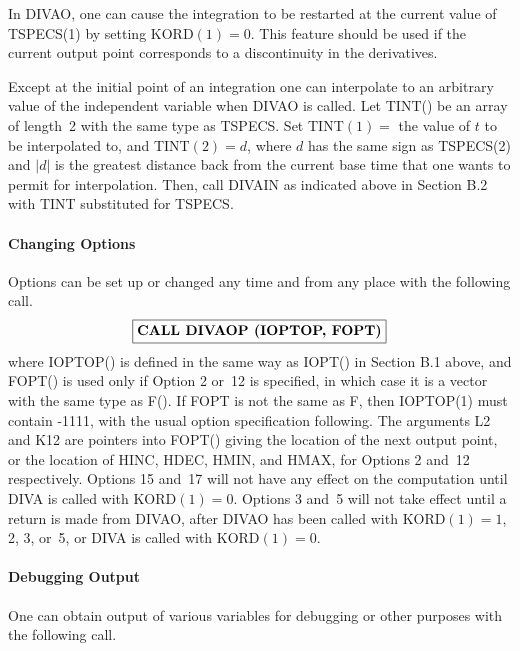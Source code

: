 \documentclass[twoside]{MATH77}
\begin{document}
In DIVAO, one can cause the integration to be restarted at the current
value of TSPECS(1) by setting KORD$(1)=0$. This feature should be used if
the current output point corresponds to a discontinuity in the derivatives.

Except at the initial point of an integration one can interpolate to an
arbitrary value of the independent variable when DIVAO is called. Let
TINT() be an array of length~2 with the same type as TSPECS. Set TINT$(1)=$
the value of $t$ to be interpolated to, and TINT$(2)=d$, where $d$ has the
same sign as TSPECS(2) and $|d|$ is the greatest distance back from the
current base time that one wants to permit for interpolation. Then, call
DIVAIN as indicated above in Section B.2 with TINT substituted for TSPECS.

\paragraph{Changing Options}
Options can be set up or changed any time and from any place with the
following call.
$$
\fbox{\bf CALL DIVAOP (IOPTOP, FOPT)}
$$
where IOPTOP() is defined in the same way as IOPT() in Section B.1
above, and FOPT() is used only if Option 2 or~12 is specified, in
which case it is a vector with the same type as F().  If FOPT is not
the same as F, then IOPTOP(1) must contain -1111, with the usual
option specification following.  The arguments L2 and K12 are pointers
into FOPT() giving the location of the next output point, or the
location of HINC, HDEC, HMIN, and HMAX, for Options 2 and~12
respectively.  Options 15 and~17 will not have any effect on the
computation until DIVA is called with KORD$(1)=0$. Options 3 and~5
will not take effect until a return is made from DIVAO, after DIVAO
has been called with KORD$(1) = 1$, 2, 3, or~5, or DIVA is called with
KORD$(1)=0.$

\paragraph{Debugging Output}
One can obtain output of various variables for debugging or other purposes
with the following call.

\begin{center}
\end{center}
\end{document}

